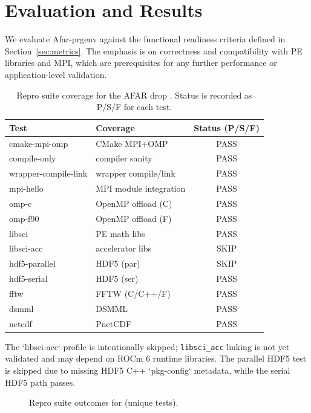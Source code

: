 \section{Evaluation and Results}
\label{sec:evaluation}
We evaluate Afar-prgenv against the functional readiness criteria defined in
Section~\ref{sec:metrics}. The emphasis is on correctness and compatibility
with PE libraries and MPI, which are prerequisites for any further performance
or application-level validation.

\begin{table}[t]
  \centering
  \small
  \setlength{\tabcolsep}{4pt}
  \caption{Repro suite coverage for the AFAR drop \afarversion. Status is
  recorded as P/S/F for each test.}
  \label{tab:repro}
  \begin{tabular}{l l c}
    \hline
    Test & Coverage & Status (P/S/F) \\
    \hline
    cmake-mpi-omp & CMake MPI+OMP & PASS \\
    compile-only & compiler sanity & PASS \\
    wrapper-compile-link & wrapper compile/link & PASS \\
    mpi-hello & MPI module integration & PASS \\
    omp-c & OpenMP offload (C) & PASS \\
    omp-f90 & OpenMP offload (F) & PASS \\
    libsci & PE math libs & PASS \\
    libsci-acc & accelerator libs & SKIP \\
    hdf5-parallel & HDF5 (par) & SKIP \\
    hdf5-serial & HDF5 (ser) & PASS \\
    fftw & FFTW (C/C++/F) & PASS \\
    dsmml & DSMML & PASS \\
    netcdf & PnetCDF & PASS \\
    \hline
  \end{tabular}
\end{table}

The `libsci-acc` profile is intentionally skipped; \texttt{libsci\_\allowbreak acc}
linking is not yet validated and may depend on ROCm 6 runtime libraries. The
parallel
HDF5 test is skipped due to missing HDF5 C++ `pkg-config` metadata, while the
serial HDF5 path passes.

\begin{figure}[t]
  \centering
  
  \caption{Repro suite outcomes for \afarversion (unique tests).}
  \label{fig:repro-summary}
\end{figure}

